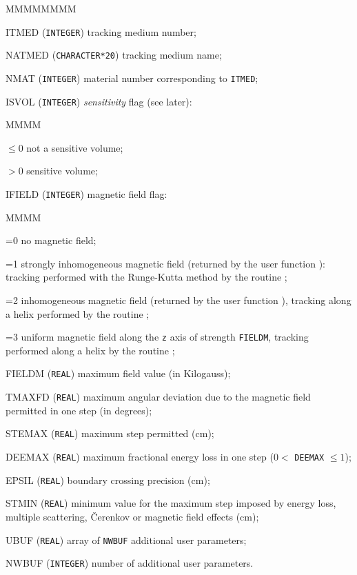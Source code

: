 \begin{DLtt}{MMMMMMMM}
\item[ITMED]      ({\tt INTEGER}) tracking medium number;
\item[NATMED]     ({\tt CHARACTER*20}) tracking medium name;
\item[NMAT]       ({\tt INTEGER}) material number corresponding to {\tt ITMED};
\item[ISVOL]      ({\tt INTEGER}) {\it sensitivity} flag (see later):
\begin{DLtt}{MMMM}
\item[$\leq$0] not a sensitive volume;
\item[$>$0] sensitive volume;
\end{DLtt}
\item[IFIELD]     ({\tt INTEGER}) magnetic field flag:
\begin{DLtt}{MMMM}
\item[=0]         no magnetic field;
\item[=1]         strongly 
inhomogeneous magnetic field (returned by the user function
): tracking performed with the Runge-Kutta method by the
routine ;
\item[=2]         inhomogeneous magnetic field (returned by the user function
), tracking along a helix performed by the routine ;
\item[=3]         uniform magnetic field along the {\tt z} axis of strength
{\tt FIELDM}, tracking performed along a helix by the routine ;
\end{DLtt}
\item[FIELDM]     ({\tt REAL}) maximum field value (in Kilogauss);
\item[TMAXFD]     ({\tt REAL}) maximum angular deviation due to the magnetic
field permitted in one step (in degrees);
\item[STEMAX]     ({\tt REAL}) maximum step permitted (cm);
\item[DEEMAX]     ({\tt REAL}) maximum fractional energy loss in one step ($0<$
                  {\tt DEEMAX} $\leq 1$);
\item[EPSIL]      ({\tt REAL}) boundary crossing precision (cm);
\item[STMIN]      ({\tt REAL}) minimum value for the maximum step imposed by 
energy loss, multiple scattering, \v{C}erenkov or magnetic field effects (cm);
\item[UBUF]       ({\tt REAL}) array of {\tt NWBUF} additional user parameters;
\item[NWBUF]      ({\tt INTEGER}) number of additional user parameters.
\end{DLtt}
 
